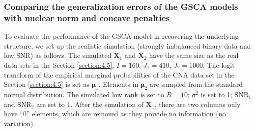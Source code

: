 \subsubsection{Comparing the generalization errors of the GSCA models with nuclear norm and concave penalties}
To evaluate the performance of the GSCA model in recovering the underlying structure, we set up the realistic simulation (strongly imbalanced binary data and low SNR) as follows. The simulated $\mathbf{X}_1$ and $\mathbf{X}_2$ have the same size as the real data sets in the Section \ref{section:4.5}, $I=160$, $J_1=410$, $J_2 = 1000$. The logit transform of the empirical marginal probabilities of the CNA data set in the Section \ref{section:4.5} is set as $\bm{\mu}_1$. Elements in $\bm{\mu}_2$ are sampled from the standard normal distribution. The simulated low rank is set to $R=10$; $\sigma^2$ is set to 1; $\text{SNR}_1$ and $\text{SNR}_2$ are set to 1. After the simulation of $\mathbf{X}_1$, there are two columns only have ``0'' elements, which are removed as they provide no information (no variation).

